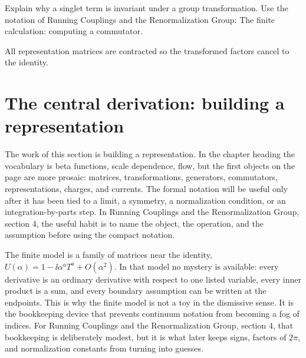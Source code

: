 \begin{exercise}
Explain why a singlet term is invariant under a group transformation.  Use the notation of Running Couplings and the Renormalization Group: The finite calculation: computing a commutator.
\begin{answer}
All representation matrices are contracted so the transformed factors cancel to the identity.
\end{answer}
\end{exercise}



\section{The central derivation: building a representation}













The work of this section is building a representation.  In the chapter heading the vocabulary is beta functions, scale dependence, flow, but the first objects on the page are more prosaic: matrices, transformations, generators, commutators, representations, charges, and currents.  The formal notation will be useful only after it has been tied to a limit, a symmetry, a normalization condition, or an integration-by-parts step.  In Running Couplings and the Renormalization Group, section 4, the useful habit is to name the object, the operation, and the assumption before using the compact notation.

The finite model is a family of matrices near the identity, \(U(\alpha)=1-\ii\alpha^aT^a+O(\alpha^2)\).  In that model no mystery is available: every derivative is an ordinary derivative with respect to one listed variable, every inner product is a sum, and every boundary assumption can be written at the endpoints.  This is why the finite model is not a toy in the dismissive sense.  It is the bookkeeping device that prevents continuum notation from becoming a fog of indices.  For Running Couplings and the Renormalization Group, section 4, that bookkeeping is deliberately modest, but it is what later keeps signs, factors of \(2\pi\), and normalization constants from turning into guesses.

